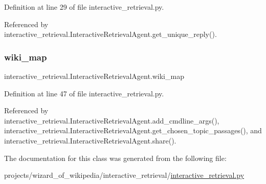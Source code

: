 Definition at line 29 of file interactive\+\_\+retrieval.\+py.



Referenced by interactive\+\_\+retrieval.\+Interactive\+Retrieval\+Agent.\+get\+\_\+unique\+\_\+reply().

\mbox{\label{classinteractive__retrieval_1_1InteractiveRetrievalAgent_ab8d026df807beebb656c537e6190e085}} 
\subsubsection{\texorpdfstring{wiki\+\_\+map}{wiki\_map}}
{\footnotesize\ttfamily interactive\+\_\+retrieval.\+Interactive\+Retrieval\+Agent.\+wiki\+\_\+map}



Definition at line 47 of file interactive\+\_\+retrieval.\+py.



Referenced by interactive\+\_\+retrieval.\+Interactive\+Retrieval\+Agent.\+add\+\_\+cmdline\+\_\+args(), interactive\+\_\+retrieval.\+Interactive\+Retrieval\+Agent.\+get\+\_\+chosen\+\_\+topic\+\_\+passages(), and interactive\+\_\+retrieval.\+Interactive\+Retrieval\+Agent.\+share().



The documentation for this class was generated from the following file\+:\begin{DoxyCompactItemize}
\item 
projects/wizard\+\_\+of\+\_\+wikipedia/interactive\+\_\+retrieval/\hyperlink{interactive__retrieval_8py}{interactive\+\_\+retrieval.\+py}\end{DoxyCompactItemize}
